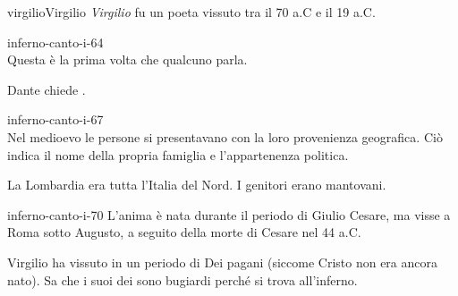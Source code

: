 \documentclass[preview]{standalone}
\begin{document}
\begin{snippetcharacter}{virgilio}{Virgilio}
    \textit{Virgilio} fu un poeta
    vissuto tra il 70 a.C e il 19 a.C.
\end{snippetcharacter}

\begin{snippet}{inferno-canto-i-64}
    \\
    Questa è la prima volta che qualcuno parla.
    
    Dante chiede .
\end{snippet}

\begin{snippet}{inferno-canto-i-67}
    \\
    Nel medioevo le persone si presentavano con la loro provenienza geografica.
    Ciò indica il nome della propria famiglia e l'appartenenza politica.
    
    La Lombardia era tutta l'Italia del Nord.
    I genitori erano mantovani.
\end{snippet}

\begin{snippet}{inferno-canto-i-70}
    L'anima è nata durante il periodo di Giulio Cesare, ma visse
    a Roma sotto Augusto, a seguito della morte di Cesare nel 44 a.C.
    
    Virgilio ha vissuto in un periodo di Dei pagani (siccome Cristo non era ancora nato). Sa che i suoi dei
    sono bugiardi perché si trova all'inferno.
\end{snippet}
\end{document}
